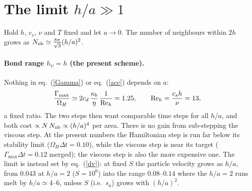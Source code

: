 \documentclass[11pt,aps,preprint,nofootinbib,superscriptaddress,tightenlines]{revtex4-2}
\def\st{\begin{equation}}
\def\stp{\end{equation}}
\def\Eq#1{eq.~(\ref{#1})}
\let\oldparagraph\paragraph
\renewcommand{\paragraph}{\par\bigskip\oldparagraph}
\begin{document}
\section{The limit $h/a\gg1$}
\label{sec:limit}

Hold $h$, $c_s$, $\nu$ and $T$ fixed and let $a\to0$.  The number of neighbours within
$2h$ grows as $N_{\rm nb}\simeq\frac{8\pi}{\sqrt3}(h/a)^2$.

\paragraph{Bond range $h_\psi=h$ (the present scheme).}  Nothing in
\Eq{Gamma} or \Eq{acc} depends on $a$:
\st
\frac{\Gamma_{\max}}{\Omega_H}\simeq 2c_d\,\frac{\kappa_b}{\eta}\,\frac{1}{{\rm Re}_h}=1.25,\qquad
{\rm Re}_h=\frac{c_sh}{\nu}=13 ,
\stp
a fixed ratio.  The two steps then want
comparable time steps for all $h/a$, and both cost $\propto N\,N_{\rm nb}\propto(h/a)^4$ per area.
There is no gain from sub-stepping the viscous step.  At the present numbers the
Hamiltonian step is run far below its stability limit ($\Omega_H\Delta t=0.10$), while the viscous
step is near its target ($\Gamma_{\max}\Delta t=0.12$ merged); the viscous step is also the more
expensive one.
The limit is instead set by \Eq{dv}: at fixed $S$ the particle velocity grows as
$h/a$, from $0.043$ at $h/a=2$ ($S=10^6$) into the range $0.08$--$0.14$ where the $h/a=2$ runs
melt by $h/a\simeq4$--$6$, unless $S$ (i.e.\ $s_a$) grows with $(h/a)^2$.
\end{document}
